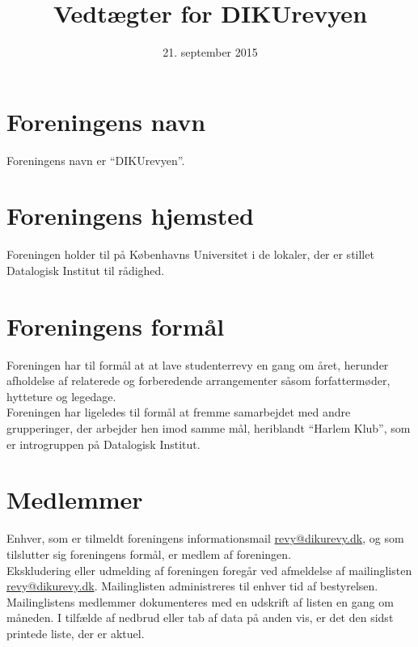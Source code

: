 \documentclass[a4paper,11pt,danish]{article}
\title{Vedtægter for DIKUrevyen}
\date{21. september 2015}
\begin{document}
\maketitle

%

\section{Foreningens navn}
Foreningens navn er "`DIKUrevyen"'.

\section{Foreningens hjemsted}
Foreningen holder til på Københavns Universitet i de lokaler, der er stillet
Datalogisk Institut til rådighed. 

\section{Foreningens formål}
Foreningen har til formål at at lave studenterrevy en gang om året, herunder
afholdelse af relaterede og forberedende arrangementer såsom forfattermøder,
hytteture og legedage. \\

\noindent Foreningen har ligeledes til formål at fremme samarbejdet med andre
grupperinger, der arbejder hen imod samme mål, heriblandt "`Harlem Klub"', som
er introgruppen på Datalogisk Institut.  

\section{Medlemmer}
Enhver, som er tilmeldt foreningens informationsmail \url{revy@dikurevy.dk},
og som tilslutter sig foreningens formål, er medlem af foreningen.\\

\noindent Ekskludering eller udmelding af foreningen foregår ved afmeldelse af mailinglisten \url{revy@dikurevy.dk}. Mailinglisten administreres til enhver tid af bestyrelsen. \\

\noindent Mailinglistens medlemmer dokumenteres med en udskrift af listen en
gang om måneden. I tilfælde af nedbrud eller tab af data på anden vis, er det
den sidst printede liste, der er aktuel.
\end{document}
